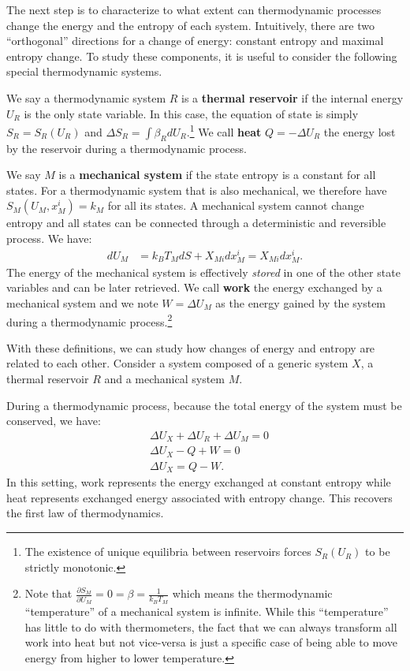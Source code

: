 \documentclass[letterpaper,twocolumn]{article}
\begin{document}
The next step is to characterize to what extent can thermodynamic processes change the energy and the entropy of each system. Intuitively, there are two ``orthogonal'' directions for a change of energy: constant entropy and maximal entropy change. To study these components, it is useful to consider the following special thermodynamic systems.

We say a thermodynamic system $R$ is a \textbf{thermal reservoir} if the internal energy $U_R$ is the only state variable. In this case, the equation of state is simply $S_R = S_R(U_R)$ and $\Delta S_R = \int \beta_R dU_R$.\footnote{The existence of unique equilibria between reservoirs forces $S_R(U_R)$ to be strictly monotonic.} We call \textbf{heat} $Q = - \Delta U_R$ the energy lost by the reservoir during a thermodynamic process.

We say $M$ is a \textbf{mechanical system} if the state entropy is a constant for all states. For a thermodynamic system that is also mechanical, we therefore have  $S_M(U_M, x^i_M) = k_M$ for all its states. A mechanical system cannot change entropy and all states can be connected through a deterministic and reversible process. We have:
\begin{equation}
\begin{aligned}
dU_M &= k_B T_M dS + X_{Mi} dx^i_M = X_{Mi} dx^i_M.
\end{aligned}
\end{equation}
The energy of the mechanical system is effectively \emph{stored} in one of the other state variables and can be later retrieved. We call \textbf{work} the energy exchanged by a mechanical system and we note $W=\Delta U_M$ as the energy gained by the system during a thermodynamic process.\footnote{Note that $\frac{\partial S_M}{\partial U_M} = 0 = \beta = \frac{1}{k_B T_M}$ which means the thermodynamic ``temperature'' of a mechanical system is infinite. While this ``temperature'' has little to do with thermometers, the fact that we can always transform all work into heat but not vice-versa is just a specific case of being able to move energy from higher to lower temperature.}

With these definitions, we can study how changes of energy and entropy are related to each other. Consider a system composed of a generic system $X$, a thermal reservoir $R$ and a mechanical system $M$.

During a thermodynamic process, because the total energy of the system must be conserved, we have:
\begin{equation}
\begin{aligned}
&\Delta U_X + \Delta U_R + \Delta U_M = 0 \\
&\Delta U_X - Q + W = 0 \\
&\Delta U_X = Q - W.
\end{aligned}
\end{equation}
In this setting, work represents the energy exchanged at constant entropy while heat represents exchanged energy associated with entropy change. This recovers the first law of thermodynamics.
\end{document}

